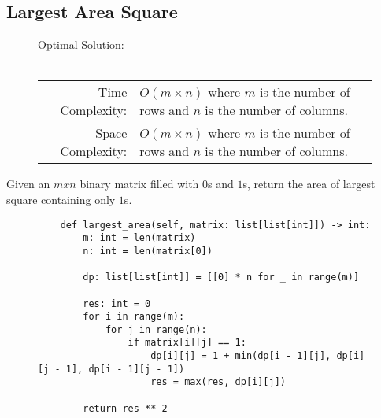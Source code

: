 
\subsection{Largest Area Square}

\begin{figure}[H]
    Optimal Solution:\\\\
    \begin{tabular}{rl}
        Time Complexity:& \(O(m \times n)\) where \(m\) is the number of rows
        and \(n\) is the number of columns.\\
        Space Complexity:& \(O(m \times n)\) where \(m\) is the number of rows
        and \(n\) is the number of columns.
    \end{tabular}
\end{figure}

Given an \(m x n\) binary matrix filled with \(0\)s and \(1\)s, return the area
of largest square containing only \(1\)s.

\begin{figure}[H]
    \centering
    \begin{verbatim}
    def largest_area(self, matrix: list[list[int]]) -> int:
        m: int = len(matrix)
        n: int = len(matrix[0])

        dp: list[list[int]] = [[0] * n for _ in range(m)]

        res: int = 0
        for i in range(m):
            for j in range(n):
                if matrix[i][j] == 1:
                    dp[i][j] = 1 + min(dp[i - 1][j], dp[i][j - 1], dp[i - 1][j - 1])
                    res = max(res, dp[i][j])

        return res ** 2
    \end{verbatim}
\end{figure}

